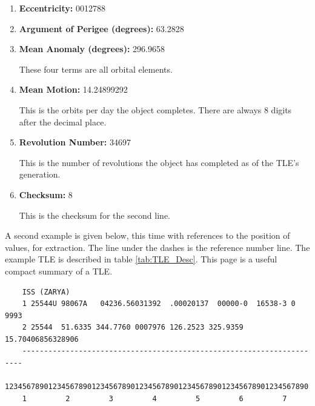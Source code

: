 \documentclass[12pt]{article}
\begin{document}
\begin{enumerate}
		
		\item \textbf{Eccentricity: } 0012788
		
		
		\item \textbf{Argument of Perigee (degrees): }63.2828
		
		
		\item \textbf{Mean Anomaly (degrees): }296.9658
		
		These four terms are all orbital elements.
		
		\item \textbf{Mean Motion: } 14.24899292
		
		This is the orbits per day the object completes. There are always 8 digits after the decimal place. 
		
		\item \textbf{Revolution Number: } 34697
	
		This is the number of revolutions the object has completed as of the TLE's generation.
		
		\item \textbf{Checksum: }8
		
		This is the checksum for the second line.
		
		
		
	\end{enumerate}\doublespacing

\par 
	
\newpage	
	\singlespacing
A second example is given below, this time with references to the position of values, for extraction. The line under the dashes is the reference number line. The example TLE is described in table  \ref{tab:TLE_Desc}. This page is a useful compact summary of a TLE.
	\begin{verbatim}
	ISS (ZARYA)
	1 25544U 98067A   04236.56031392  .00020137  00000-0  16538-3 0  9993
	2 25544  51.6335 344.7760 0007976 126.2523 325.9359 15.70406856328906
	----------------------------------------------------------------------
	1234567890123456789012345678901234567890123456789012345678901234567890   
	1         2         3         4         5         6         7
	
	\end{verbatim}%
	
\end{document}
